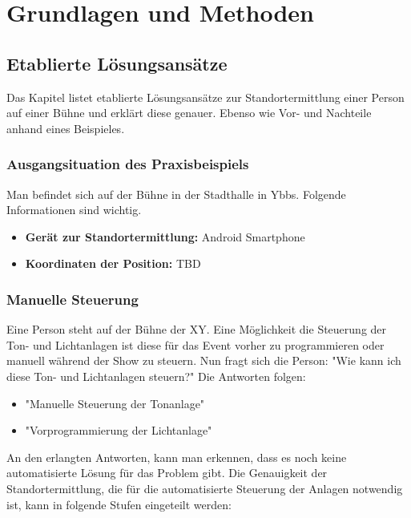 
\pagestyle{fancy} \frenchspacing
{}
\renewcommand{\chaptermark}[1]{\markboth{#1}{}}

\renewcommand{\textfraction}{0}
\renewcommand{\floatpagefraction}{0.999}
\renewcommand{\topfraction}{0.7}
\renewcommand{\bottomfraction}{0.999}
\lfoot{}

\chapter{Grundlagen und Methoden}

\section{Etablierte Lösungsansätze}
Das Kapitel listet etablierte Lösungsansätze zur Standortermittlung einer Person auf einer Bühne und erklärt diese genauer. Ebenso wie Vor- und Nachteile anhand eines Beispieles.

\subsection{Ausgangsituation des Praxisbeispiels}

Man befindet sich auf der Bühne in der Stadthalle in Ybbs. Folgende Informationen sind wichtig.
\begin{itemize}
	\item \textbf{Gerät zur Standortermittlung: } Android Smartphone
	\item \textbf{Koordinaten der Position: } TBD  
\end{itemize}

\subsection{Manuelle Steuerung}
Eine Person steht auf der Bühne der XY. Eine Möglichkeit die Steuerung der Ton- und Lichtanlagen ist diese für das Event vorher zu programmieren oder manuell während der Show zu steuern. Nun fragt sich die Person: "Wie kann ich diese Ton- und Lichtanlagen steuern?" Die Antworten folgen:

\begin{itemize}
	\item "Manuelle Steuerung der Tonanlage"
	\item "Vorprogrammierung der Lichtanlage"
\end{itemize}

An den erlangten Antworten, kann man erkennen, dass es noch keine automatisierte Lösung für das Problem gibt. Die Genauigkeit der Standortermittlung, die für die automatisierte Steuerung der Anlagen notwendig ist, kann in folgende Stufen eingeteilt werden: 

